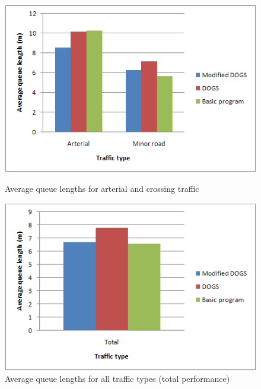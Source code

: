 \begin{figure}[ht]

    \begin{minipage}[b]{0.5\linewidth}

\begin{center}
\includegraphics[scale=0.40]{aveq.png} 
\end{center}
\caption{Average queue lengths for arterial and crossing traffic}
\label{fig:aveq}

    \end{minipage}
    \hspace{0.5cm}
    \begin{minipage}[b]{0.5\linewidth}

\begin{center}
\includegraphics[scale=0.40]{aveq_total.png} 
\end{center}
\caption{Average queue lengths for all traffic types (total performance)}
\label{fig:aveq_tot}

    \end{minipage}

\end{figure}


